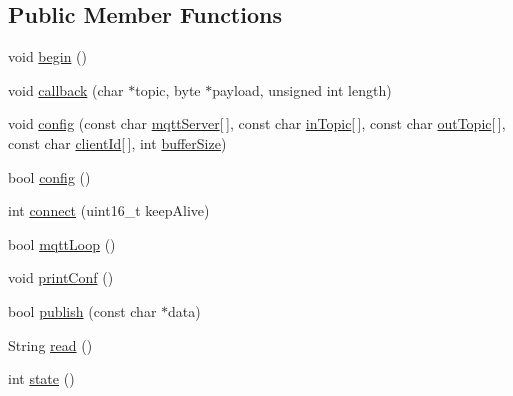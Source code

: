 \subsection*{Public Member Functions}
\begin{DoxyCompactItemize}
\item 
void \hyperlink{classCoolMQTT_ac9248808641ebf3054ed0620ea9d0100}{begin} ()
\item 
void \hyperlink{classCoolMQTT_a30d82ad665bfb603f46ecdbc290775df}{callback} (char $\ast$topic, byte $\ast$payload, unsigned int length)
\item 
void \hyperlink{classCoolMQTT_a0158596b9a2297c8ba609b56ce6bace1}{config} (const char \hyperlink{classCoolMQTT_ab8bb951f87ddbf92db74c2ad16a3e53e}{mqtt\+Server}\mbox{[}$\,$\mbox{]}, const char \hyperlink{classCoolMQTT_a4492f52a441e83cc5151010317fdb52d}{in\+Topic}\mbox{[}$\,$\mbox{]}, const char \hyperlink{classCoolMQTT_a109c786a17b463f9eeba046194279522}{out\+Topic}\mbox{[}$\,$\mbox{]}, const char \hyperlink{classCoolMQTT_af01bc6160c5a191e90df1b6e7318828d}{client\+Id}\mbox{[}$\,$\mbox{]}, int \hyperlink{classCoolMQTT_a7f3cf26b51d6770f216e42c5ef13ca9f}{buffer\+Size})
\item 
bool \hyperlink{classCoolMQTT_a6571671781a505feca9a8a56e256c6bc}{config} ()
\item 
int \hyperlink{classCoolMQTT_a58b0b1f64b269c2681685208262fba1d}{connect} (uint16\+\_\+t keep\+Alive)
\item 
bool \hyperlink{classCoolMQTT_aa5eaae967b562b62cbcf2b8d81f6e5d5}{mqtt\+Loop} ()
\item 
void \hyperlink{classCoolMQTT_a40553a0ad4b5ecf1cb4411ab54ca85fb}{print\+Conf} ()
\item 
bool \hyperlink{classCoolMQTT_ace977b3e90ab14b1199fe5c4fb0a13ec}{publish} (const char $\ast$data)
\item 
String \hyperlink{classCoolMQTT_ae3c18f6ae9723746d32765f1c8f176ca}{read} ()
\item 
int \hyperlink{classCoolMQTT_a5d003307eff78efbd585e42b43b72b6d}{state} ()
\end{DoxyCompactItemize}
